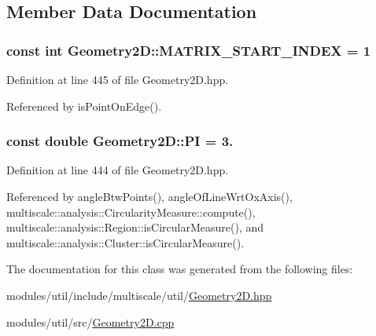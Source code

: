 \subsection{Member Data Documentation}
\hypertarget{classmultiscale_1_1Geometry2D_ade1d55d3ef110b73d42a3e4c4360ba17}{
\subsubsection[{M\-A\-T\-R\-I\-X\-\_\-\-S\-T\-A\-R\-T\-\_\-\-I\-N\-D\-E\-X}]{\setlength{\rightskip}{0pt plus 5cm}const int Geometry2\-D\-::\-M\-A\-T\-R\-I\-X\-\_\-\-S\-T\-A\-R\-T\-\_\-\-I\-N\-D\-E\-X = 1\hspace{0.3cm}{\ttfamily [static]}}}\label{classmultiscale_1_1Geometry2D_ade1d55d3ef110b73d42a3e4c4360ba17}


Definition at line 445 of file Geometry2\-D.\-hpp.



Referenced by is\-Point\-On\-Edge().

\hypertarget{classmultiscale_1_1Geometry2D_a7039b8bbe89283e22744c0631d597660}{
\subsubsection[{P\-I}]{\setlength{\rightskip}{0pt plus 5cm}const double Geometry2\-D\-::\-P\-I = 3.\hspace{0.3cm}{\ttfamily [static]}}}\label{classmultiscale_1_1Geometry2D_a7039b8bbe89283e22744c0631d597660}


Definition at line 444 of file Geometry2\-D.\-hpp.



Referenced by angle\-Btw\-Points(), angle\-Of\-Line\-Wrt\-Ox\-Axis(), multiscale\-::analysis\-::\-Circularity\-Measure\-::compute(), multiscale\-::analysis\-::\-Region\-::is\-Circular\-Measure(), and multiscale\-::analysis\-::\-Cluster\-::is\-Circular\-Measure().



The documentation for this class was generated from the following files\-:\begin{DoxyCompactItemize}
\item 
modules/util/include/multiscale/util/\hyperlink{Geometry2D_8hpp}{Geometry2\-D.\-hpp}\item 
modules/util/src/\hyperlink{Geometry2D_8cpp}{Geometry2\-D.\-cpp}\end{DoxyCompactItemize}
